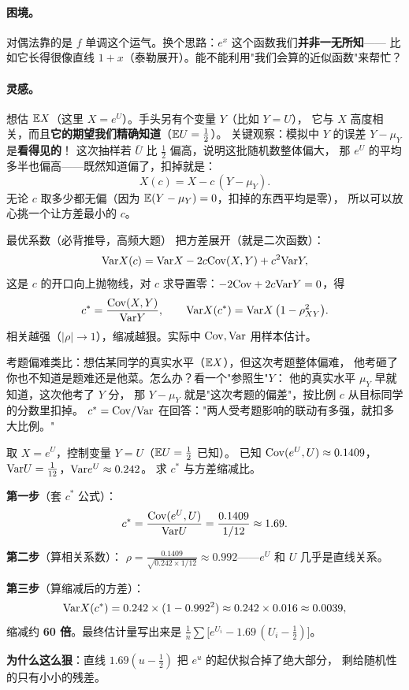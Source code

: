 \paragraph{困境。}
对偶法靠的是 $f$ 单调这个运气。换个思路：$e^x$ 这个函数我们\textbf{并非一无所知}——
比如它长得很像直线 $1+x$（泰勒展开）。能不能利用"我们会算的近似函数"来帮忙？

\paragraph{灵感。}
想估 $\mathbb{E} X$（这里 $X=e^U$）。手头另有个变量 $Y$（比如 $Y=U$），
它与 $X$ 高度相关，而且\textbf{它的期望我们精确知道}（$\mathbb{E} U=\frac12$）。
关键观察：模拟中 $Y$ 的误差 $Y-\mu_Y$ 是\textbf{看得见的}！
这次抽样若 $\bar U$ 比 $\frac12$ 偏高，说明这批随机数整体偏大，
那 $e^U$ 的平均多半也偏高——既然知道偏了，扣掉就是：
\[
X(c)=X-c\,(Y-\mu_Y).
\]
无论 $c$ 取多少都无偏（因为 $\mathbb{E}(Y-\mu_Y)=0$，扣掉的东西平均是零），
所以可以放心挑一个让方差最小的 $c$。

\begin{kbox}{最优系数（必背推导，高频大题）}
把方差展开（就是二次函数）：
\[
\mathrm{Var} X(c)=\mathrm{Var} X-2c\mathrm{Cov}(X,Y)+c^2\mathrm{Var} Y ,
\]
这是 $c$ 的开口向上抛物线，对 $c$ 求导置零：$-2\mathrm{Cov}+2c\mathrm{Var} Y=0$，得
\[
c^*=\frac{\mathrm{Cov}(X,Y)}{\mathrm{Var} Y},\qquad
\mathrm{Var} X(c^*)=\mathrm{Var} X\,\big(1-\rho_{XY}^2\big).
\]
相关越强（$|\rho|\to1$），缩减越狠。实际中 $\mathrm{Cov},\mathrm{Var}$ 用样本估计。
\end{kbox}

\begin{pbox}
考题偏难类比：想估某同学的真实水平（$\mathbb{E} X$），但这次考题整体偏难，
他考砸了你也不知道是题难还是他菜。怎么办？看一个"参照生"$Y$：
他的真实水平 $\mu_Y$ 早就知道，这次他考了 $Y$ 分，
那 $Y-\mu_Y$ 就是"这次考题的偏差"，按比例 $c$ 从目标同学的分数里扣掉。
$c^*=\mathrm{Cov}/\mathrm{Var}$ 在回答："两人受考题影响的联动有多强，就扣多大比例。"
\end{pbox}

\begin{exbox}
取 $X=e^U$，控制变量 $Y=U$（$\mathbb{E} U=\frac12$ 已知）。
已知 $\mathrm{Cov}(e^U,U)\approx0.1409$，$\mathrm{Var} U=\frac1{12}$，$\mathrm{Var} e^U\approx0.242$。
求 $c^*$ 与方差缩减比。
\end{exbox}
\begin{sol}
\textbf{第一步}（套 $c^*$ 公式）：
\[
c^*=\frac{\mathrm{Cov}(e^U,U)}{\mathrm{Var} U}=\frac{0.1409}{1/12}\approx1.69 .
\]

\textbf{第二步}（算相关系数）：
$\rho=\frac{0.1409}{\sqrt{0.242\times1/12}}\approx0.992$——$e^U$ 和 $U$ 几乎是直线关系。

\textbf{第三步}（算缩减后的方差）：
\[
\mathrm{Var} X(c^*)=0.242\times(1-0.992^2)\approx0.242\times0.016\approx0.0039 ,
\]
缩减约 \textbf{60 倍}。最终估计量写出来是
$\frac1n\sum\big[e^{U_i}-1.69\,(U_i-\tfrac12)\big]$。

\textbf{为什么这么狠}：直线 $1.69(u-\frac12)$ 把 $e^u$ 的起伏拟合掉了绝大部分，
剩给随机性的只有小小的残差。
\end{sol}

